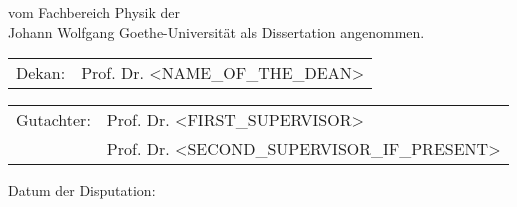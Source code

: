 \thispagestyle{empty}

\vspace*{0.5\textheight}

\noindent{}%
vom Fachbereich Physik der \\[2pt]
Johann Wolfgang Goethe-Universit\"at als Dissertation angenommen.

\vspace*{2cm}

\noindent{}%
\begin{tabular}{@{}l@{\hskip 1ex}l}
  Dekan: & Prof. Dr. <NAME_OF_THE_DEAN>
\end{tabular}

\vspace*{1cm}

\noindent{}%
\begin{tabular}{@{}l@{\hskip 1ex}l}
  Gutachter: & Prof. Dr. <FIRST_SUPERVISOR>\\
             & Prof. Dr. <SECOND_SUPERVISOR_IF_PRESENT>
\end{tabular}

\vspace*{2cm}
\noindent{}%
Datum der Disputation:

